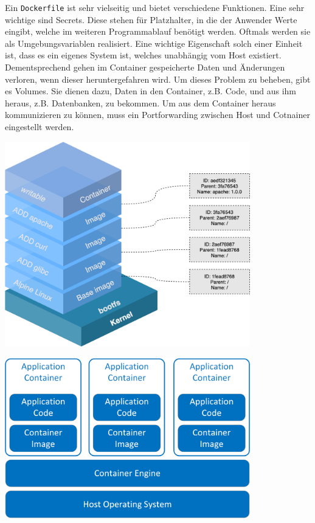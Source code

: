 \documentclass[
    headings=optiontotocandhead,%
    twoside,
    numbers=noenddot,%
    12pt, %
    titlepage, %
    parskip=full, %
    listof=leveldown, 
    numbers=noenddot, %
    a4paper,DIV=14,
    BCOR=15mm,
]{scrbook}
\newcommand{\passthrough}[1]{#1}
\let\origfigure=\figure
\let\endorigfigure=\endfigure
\renewenvironment{figure}[1][]{%
   \origfigure[H]
}{%
   \endorigfigure
}
\begin{document}
Ein \passthrough{\lstinline!Dockerfile!} ist sehr vielseitig und bietet
verschiedene Funktionen. Eine sehr wichtige sind Secrets. Diese stehen
für Platzhalter, in die der Anwender Werte eingibt, welche im weiteren
Programmablauf benötigt werden. Oftmals werden sie als
Umgebungsvariablen realisiert. Eine wichtige Eigenschaft solch einer
Einheit ist, dass es ein eigenes System ist, welches unabhängig vom Host
existiert. Dementsprechend gehen im Container gespeicherte Daten und
Änderungen verloren, wenn dieser heruntergefahren wird. Um dieses
Problem zu beheben, gibt es Volumes. Sie dienen dazu, Daten in den
Container, z.B. Code, und aus ihm heraus, z.B. Datenbanken, zu bekommen.
Um aus dem Container heraus kommunizieren zu können, muss ein
Portforwarding zwischen Host und Cotnainer eingestellt werden.

\begin{figure}
\centering
\includegraphics[width=0.8\textwidth,height=\textheight]{img/Schrempf/Container-Layers-Overview.png}
\caption{Containerschichten
{[}\protect\hyperlink{ref-docker-image-layers}{24}{]}}
\end{figure}

\begin{figure}
\centering
\includegraphics[width=0.8\textwidth,height=\textheight]{img/Schrempf/Container-Infrastructure-Overview.png}
\caption{Übersicht vom Containeraufbau
{[}\protect\hyperlink{ref-container-overview}{25}{]}}
\end{figure}
\end{document}
